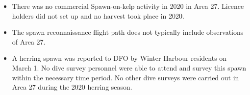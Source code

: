 \begin{itemize}

\item There was no commercial Spawn-on-kelp activity in 2020 in Area 27.
Licence holders did not set up and no harvest took place in 2020.

\item The spawn reconnaissance flight path does not typically include observations of Area 27.

\item A herring spawn was reported to DFO by Winter Harbour residents on March 1.
No dive survey personnel were able to attend and survey this spawn within the necessary time period.
No other dive surveys were carried out in Area 27 during the 2020 herring season.

\end{itemize}
